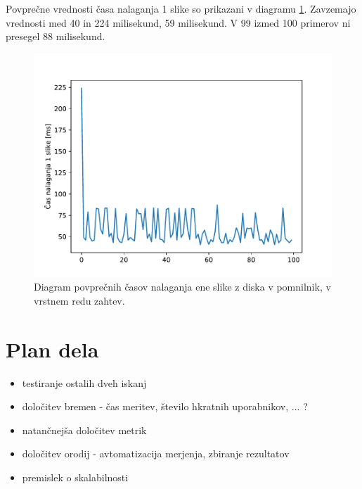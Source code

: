 Povprečne vrednosti časa nalaganja 1 slike so prikazani v diagramu \ref{fig:1_poskusno_pic_loading_time}.
Zavzemajo vrednosti med 40 in 224 milisekund, 59 milisekund.
V 99 izmed 100 primerov ni presegel 88 milisekund.

\begin{figure}[H]
\centering
\includegraphics[scale=0.8]{Img/1_poskusno_pic_loading_time.pdf}
\caption{Diagram povprečnih časov nalaganja ene slike z diska v pomnilnik, v vrstnem redu zahtev.}
\label{fig:1_poskusno_pic_loading_time}
\end{figure}

\section{Plan dela}

\begin{itemize}
\item testiranje ostalih dveh iskanj
\item določitev bremen - čas meritev, število hkratnih uporabnikov, ... ?
\item natančnejša določitev metrik 
\item določitev orodij - avtomatizacija merjenja, zbiranje rezultatov
\item premislek o skalabilnosti
\end{itemize}

